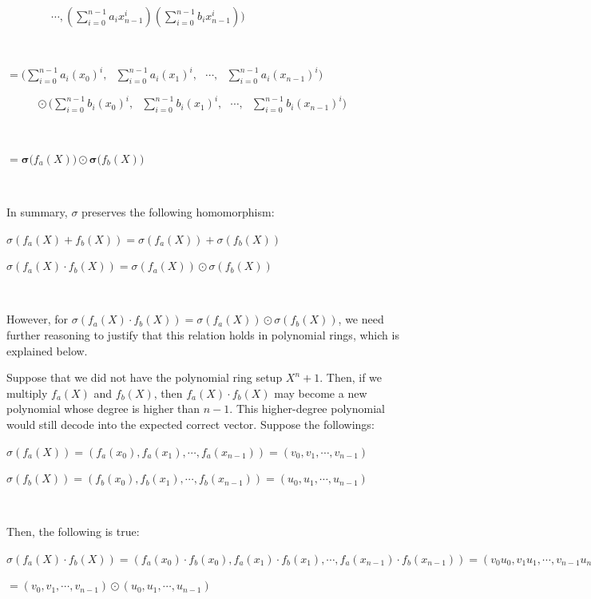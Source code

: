 $  \text{ } \text{ } \text{ } \text{ } \text{ } \text{ }
\cdots,
\left(\sum\limits_{i=0}^{n-1}a_ix_{n-1}^i\right)\left( \sum\limits_{i=0}^{n-1}b_ix_{n-1}^i\right)
\Bigg)$

$ $

$ = \Bigg(\sum\limits_{i=0}^{n-1}a_i(x_0)^i, \text{ } \sum\limits_{i=0}^{n-1}a_i(x_1)^i, \text{ } \cdots, \text{ } \sum\limits_{i=0}^{n-1}a_i(x_{n-1})^i\Bigg)$

$  \text{ } \text{ } \text{ } \text{ }  \odot  \Bigg(\sum\limits_{i=0}^{n-1}b_i(x_0)^i, \text{ } 
\sum\limits_{i=0}^{n-1}b_i(x_1)^i, \text{ }
\cdots, \text{ } \sum\limits_{i=0}^{n-1}b_i(x_{n-1})^i\Bigg)$

$ $

$= \bm{\sigma(}f_a(X)\bm{)} \odot \bm{\sigma(}f_b(X)\bm{)}$

$ $

In summary, $\sigma$ preserves the following homomorphism:

$\sigma(f_a(X) + f_b(X)) = \sigma(f_a(X)) + \sigma(f_b(X))$

$\sigma(f_a(X) \cdot f_b(X)) = \sigma(f_a(X)) \odot \sigma(f_b(X))$

$ $

However, for $\sigma(f_a(X) \cdot f_b(X)) = \sigma(f_a(X)) \odot \sigma(f_b(X))$, we need further reasoning to justify that this relation holds in polynomial rings, which is explained below.


 Suppose that we did not have the polynomial ring setup $X^n + 1$. Then, if we multiply $f_a(X)$ and $f_b(X)$, then $f_a(X) \cdot f_b(X)$ may become a new polynomial whose degree is higher than $n-1$. This higher-degree polynomial would still decode into the expected correct vector. Suppose the followings:

$\sigma(f_a(X)) = (f_a(x_0), f_a(x_1), \cdots, f_a(x_{n-1})) = (v_0, v_1, \cdots, v_{n-1})$

$\sigma(f_b(X)) = (f_b(x_0), f_b(x_1), \cdots, f_b(x_{n-1})) = (u_0, u_1, \cdots, u_{n-1})$

$ $

Then, the following is true: 

$\sigma(f_a(X) \cdot f_b(X)) = (f_a(x_0)\cdot f_b(x_0), f_a(x_1)\cdot f_b(x_1), \cdots, f_a(x_{n-1})\cdot f_b(x_{n-1})) = (v_0u_0, v_1u_1, \cdots, v_{n-1}u_{n-1})$

$= (v_0, v_1, \cdots, v_{n-1}) \odot (u_0, u_1, \cdots, u_{n-1}) $

$ $

